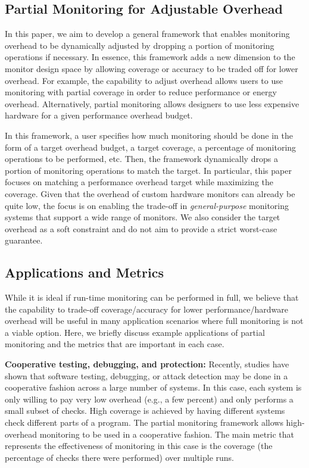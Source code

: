 \subsection{Partial Monitoring for Adjustable Overhead}

In this paper, we aim to develop a general framework that enables monitoring
overhead to be dynamically adjusted by dropping a portion of monitoring 
operations if necessary. In essence, this framework adds a new dimension to
the monitor design space by allowing coverage or accuracy to be traded off
for lower overhead. For example, the capability to adjust overhead allows users
to use monitoring with partial coverage in order to reduce performance
or energy overhead. Alternatively, partial monitoring allows designers to use
less expensive hardware for a given performance overhead budget.

In this framework, a user specifies how much monitoring should be done in the form of
a target 
overhead budget, a target coverage, a percentage of monitoring operations to be performed, etc.
Then, the framework dynamically drops a portion of monitoring operations to match
the target. In particular, this paper focuses on matching a performance overhead target
while maximizing the coverage. Given that the overhead of custom hardware monitors can
already be quite low, the focus is on enabling the trade-off in {\em general-purpose} 
monitoring systems that support a wide range of monitors.
We also consider the target overhead as a soft constraint and do not aim to
provide a strict worst-case guarantee.

\subsection{Applications and Metrics}

While it is ideal if run-time monitoring can be performed in full, we believe that
the capability to trade-off coverage/accuracy for lower performance/hardware overhead
will be useful in many application scenarios where full monitoring is not a viable option.
Here, we briefly discuss example applications of partial monitoring and the metrics
that are important in each case.

{\bf Cooperative testing, debugging, and protection:}
Recently, studies \cite{liblit-pldi05, chilimbi-asplos04, greathouse-cgo11, testudo-micro08} have shown that software testing, debugging,
or attack detection may be done in a cooperative fashion across
a large number of systems. In this case, each system is only willing to pay very low
overhead (e.g., a few percent) and only performs a small subset of checks. 
High coverage is achieved by having different systems check different parts of a program.
The partial monitoring framework allows high-overhead monitoring to be used in a
cooperative fashion. 
The main metric that represents the effectiveness of monitoring in this case is
the coverage (the percentage of checks there were performed) over multiple runs.

